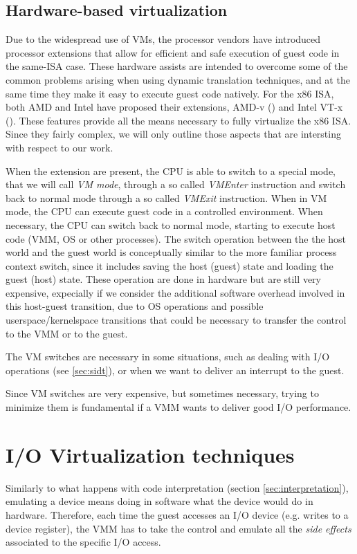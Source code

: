 \subsection{Hardware-based virtualization}
\label{sec:hbv}
Due to the widespread use of VMs, the processor vendors have introduced processor extensions that allow for efficient and safe execution
of guest code in the same-ISA case. These hardware assists are intended to overcome some of the common problems arising when using
dynamic translation techniques, and at the same time they make it easy to execute guest code natively.
For the x86 ISA, both AMD and Intel have proposed their extensions, AMD-v (\cite{ref:amd-v}) and Intel VT-x (\cite{ref:intel-VT-x}).
These features provide all the means necessary to fully virtualize the x86 ISA. Since they fairly complex, we will only outline those
aspects that are intersting with respect to our work.

\vspace{0.5cm}

When the extension are present, the CPU is able to switch to a special mode, that we will call \emph{VM mode}, through a so called
\emph{VMEnter} instruction and switch back to normal mode through a so called \emph{VMExit} instruction.
When in VM mode, the CPU can execute guest code in a controlled environment. When necessary, the CPU can switch back to normal mode, 
starting to execute host code (VMM, OS or other processes).
The switch operation between the the host world and the guest world is conceptually similar to the more familiar process context switch,
since it includes saving the host (guest) state and loading the guest (host) state. These operation are done in hardware but are
still very expensive, expecially if we consider the additional software overhead involved in this host-guest transition, due to
OS operations and possible userspace/kernelspace transitions that could be necessary to transfer the control to the VMM or to the
guest.

The VM switches are necessary in some situations, such as dealing with I/O operations (see \ref{sec:sidt}), or when we want
to deliver an interrupt to the guest.

Since VM switches are very expensive, but sometimes necessary, trying to minimize them is fundamental if a VMM
wants to deliver good I/O performance.


\section{I/O Virtualization techniques}
Similarly to what happens with code interpretation (section \ref{sec:interpretation}), emulating a device means doing in software what the
device would do in hardware. Therefore, each time the guest accesses an I/O device (e.g. writes to a device register), the VMM has to take
the control and emulate all the \emph{side effects} associated to the specific I/O access.

